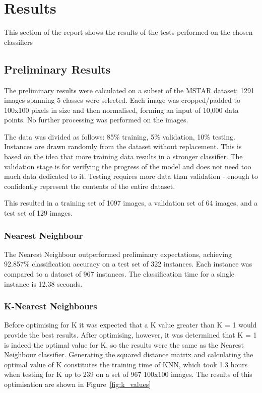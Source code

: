 \chapter{Results}
This section of the report shows the results of the tests performed on the chosen classifiers

\section{Preliminary Results}

The preliminary results were calculated on a subset of the MSTAR dataset; 1291 images spanning 5 classes were selected. Each image was cropped/padded to 100x100 pixels in size and then normalised, forming an input of 10,000 data points. No further processing was performed on the images.

The data was divided as follows: 85\% training, 5\% validation, 10\% testing. Instances are drawn randomly from the dataset without replacement. This is based on the idea that more training data results in a stronger classifier. The validation stage is for verifying the progress of the model and does not need too much data dedicated to it. Testing requires more data than validation - enough to confidently represent the contents of the entire dataset.

This resulted in a training set of 1097 images, a validation set of 64 images, and a test set of 129 images.

\subsection{Nearest Neighbour}
The Nearest Neighbour outperformed preliminary expectations, achieving 92.857\% classification accuracy on a test set of 322 instances. Each instance was compared to a dataset of 967 instances. The classification time for a single instance is 12.38 seconds.

\subsection{K-Nearest Neighbours}
Before optimising for K it was expected that a K value greater than K = 1 would provide the best results. After optimising, however, it was determined that K = 1 is indeed the optimal value for K, so the results were the same as the Nearest Neighbour classifier. Generating the squared distance matrix and calculating the optimal value of K constitutes the training time of KNN, which took 1.3 hours when testing for K up to 239 on a set of 967 100x100 images. The results of this optimisation are shown in Figure~\ref{fig:k_values}

